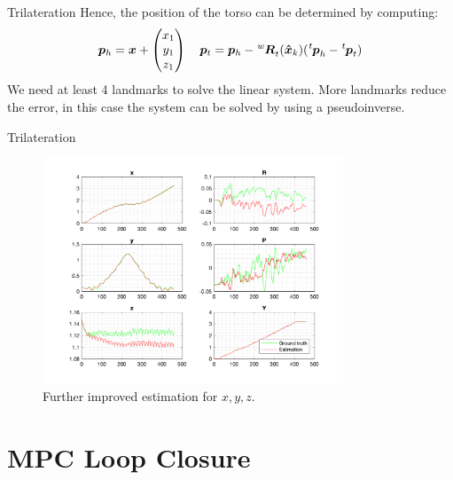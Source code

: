 \documentclass[10pt]{beamer}
\begin{document}
    \begin{frame}[fragile]{Trilateration}
        \justifying
        Hence, the position of the torso can be determined by computing:
        \begin{equation*}
            \bm{p}_h
                =
            \bm{x} +
            \begin{pmatrix}
                x_1 \\
                y_1 \\
                z_1
            \end{pmatrix} \quad
            \bm{p}_t = \bm{p}_h - \tensor[^w]{\bm{R}}{_t}(\bm{\hat{x}}_{k}) (\tensor[^t]{\bm{p}}{_h} - \tensor[^t]{\bm{p}}{_t})
        \end{equation*}
        We need at least 4 landmarks to solve the linear system. More
        landmarks reduce the error, in this case the system can be solved
        by using a pseudoinverse.
    \end{frame}

    \begin{frame}[fragile]{Trilateration}
        \begin{figure}
        \caption{Further improved estimation for $x, y, z$.}
        \vspace{-0.3cm}
        \includegraphics[width=0.8\textwidth]{images/trilateration.png}
        \end{figure}
    \end{frame}

    \section{MPC Loop Closure}
\end{document}
